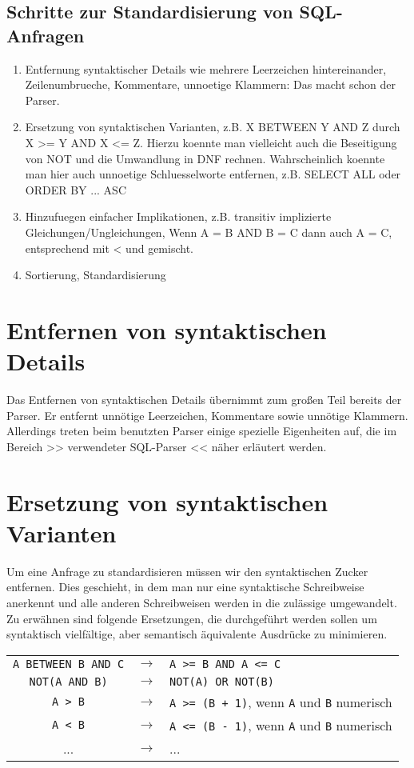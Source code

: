 \subsection*{Schritte zur Standardisierung von SQL-Anfragen}

\begin{enumerate}
\item Entfernung syntaktischer Details wie mehrere Leerzeichen
    hintereinander, Zeilenumbrueche, Kommentare,
    unnoetige Klammern: Das macht schon der Parser.
\item Ersetzung von syntaktischen Varianten,
    z.B. X BETWEEN Y AND Z durch X >= Y AND X <= Z.
    Hierzu koennte man vielleicht auch die Beseitigung von NOT
    und die Umwandlung in DNF rechnen.
    Wahrscheinlich koennte man hier auch unnoetige Schluesselworte
    entfernen, z.B. SELECT ALL oder ORDER BY ... ASC
\item Hinzufuegen einfacher Implikationen,
    z.B. transitiv implizierte Gleichungen/Ungleichungen,
    Wenn A = B AND B = C dann auch A = C,
    entsprechend mit < und gemischt.
\item Sortierung, Standardisierung 
\end{enumerate}

\section{Entfernen von syntaktischen Details}

Das Entfernen von syntaktischen Details übernimmt zum großen Teil bereits der Parser. Er entfernt unnötige Leerzeichen, Kommentare sowie unnötige Klammern. Allerdings treten beim benutzten Parser einige spezielle Eigenheiten auf, die im Bereich >> verwendeter SQL-Parser << näher erläutert werden.

\section{Ersetzung von syntaktischen Varianten}

Um eine Anfrage zu standardisieren müssen wir den syntaktischen Zucker entfernen. Dies geschieht, in dem man nur eine syntaktische Schreibweise anerkennt und alle anderen Schreibweisen werden in die zulässige umgewandelt. Zu erwähnen sind folgende Ersetzungen, die durchgeführt werden sollen um syntaktisch vielfältige, aber semantisch äquivalente Ausdrücke zu minimieren.

\begin{tabular}{ccl}
\verb|A BETWEEN B AND C| & $\to$  & \verb|A >= B AND A <= C|\\
\verb|NOT(A AND B)| & $\to$  & \verb|NOT(A) OR NOT(B)|\\
\verb|A > B| & $\to$  & \verb|A >= (B + 1)|, wenn \verb|A| und \verb|B| numerisch\\
\verb|A < B| & $\to$  & \verb|A <= (B - 1)|, wenn \verb|A| und \verb|B| numerisch\\
... & $\to$ & ...\\
\end{tabular}


